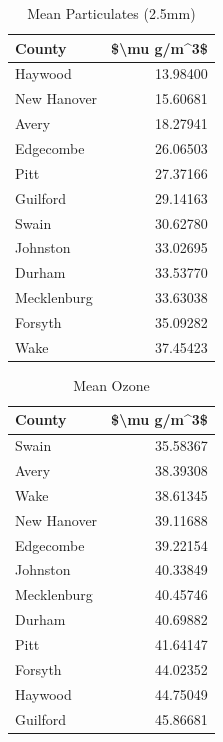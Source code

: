 \documentclass[
]{article}
\begin{document}
\begin{table}

\caption{\label{tab:data.summary}Mean Particulates (2.5mm)}
\centering
\begin{tabular}[t]{l|r}
\hline
County & \$\textbackslash{}mu g/m\textasciicircum{}3\$\\
\hline
Haywood & 13.98400\\
\hline
New Hanover & 15.60681\\
\hline
Avery & 18.27941\\
\hline
Edgecombe & 26.06503\\
\hline
Pitt & 27.37166\\
\hline
Guilford & 29.14163\\
\hline
Swain & 30.62780\\
\hline
Johnston & 33.02695\\
\hline
Durham & 33.53770\\
\hline
Mecklenburg & 33.63038\\
\hline
Forsyth & 35.09282\\
\hline
Wake & 37.45423\\
\hline
\end{tabular}
\end{table}

\begin{table}

\caption{\label{tab:data.summary}Mean Ozone}
\centering
\begin{tabular}[t]{l|r}
\hline
County & \$\textbackslash{}mu g/m\textasciicircum{}3\$\\
\hline
Swain & 35.58367\\
\hline
Avery & 38.39308\\
\hline
Wake & 38.61345\\
\hline
New Hanover & 39.11688\\
\hline
Edgecombe & 39.22154\\
\hline
Johnston & 40.33849\\
\hline
Mecklenburg & 40.45746\\
\hline
Durham & 40.69882\\
\hline
Pitt & 41.64147\\
\hline
Forsyth & 44.02352\\
\hline
Haywood & 44.75049\\
\hline
Guilford & 45.86681\\
\hline
\end{tabular}
\end{table}

\newpage
\end{document}
